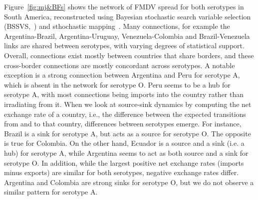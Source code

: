 \documentclass[10pt]{article}
\begin{document}
Figure~\ref{fig:mj&BFs} shows the network of FMDV spread for both serotypes in South America, reconstructed using Bayesian stochastic search variable selection (BSSVS,~\cite{Lemey2009}) and sthochastic mapping~\citep{Minin2008b}. %
Many connections, for example the Argentina-Brazil, Argentina-Uruguay, Venezuela-Colombia and Brazil-Venezuela links are shared between serotypes, with varying degrees of statistical support.
Overall, connections exist mostly between countries that share borders, and these cross-border connections are mostly concordant across serotypes.
A notable exception is a strong connection between Argentina and Peru for serotype A, which is absent in the network for serotype O.
Peru seems to be a hub for serotype A, with most connections being imports into the country rather than irradiating from it.
When we look at source-sink dynamics by computing the net exchange rate of a country, i.e., the difference between the expected transitions from and to that country, differences between serotypes emerge.
For instance,  Brazil is a sink for serotype A, but acts as a source for serotype O.
The opposite is true for Colombia.
On the other hand, Ecuador is a source and a sink (i.e. a hub) for serotype A, while  Argentina seems to act as both source and a sink for serotype O.
In addition, while the largest positive net exchange rates (imports minus exports) are similar for both serotypes, negative exchange rates differ. %
Argentina and Colombia are strong sinks for serotype O, but we do not observe a similar pattern for serotype A. 
\end{document}
